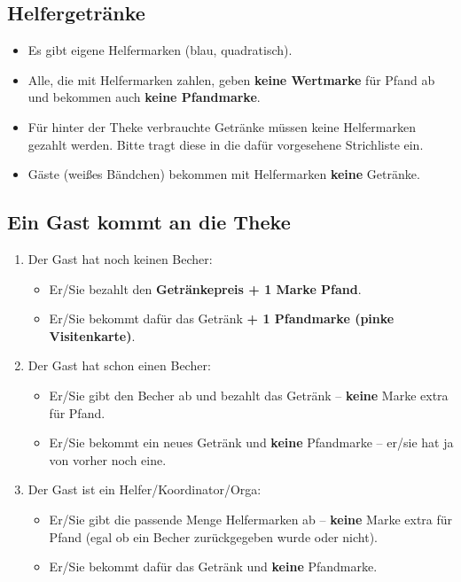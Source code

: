 \subsection{Helfergetränke}
\begin{itemize}
    \item Es gibt eigene Helfermarken (blau, quadratisch).
    \item Alle, die mit Helfermarken zahlen, geben \textbf{keine Wertmarke} für Pfand ab und bekommen auch \textbf{keine Pfandmarke}.
    \item Für hinter der Theke verbrauchte Getränke müssen keine Helfermarken gezahlt werden. Bitte tragt diese in die dafür vorgesehene Strichliste ein.
    \item Gäste (weißes Bändchen) bekommen mit Helfermarken \textbf{keine} Getränke.
\end{itemize}
\subsection{Ein Gast kommt an die Theke}
\begin{enumerate}
    \item Der Gast hat noch keinen Becher:
        \begin{itemize}
            \item Er/Sie bezahlt den \textbf{Getränkepreis + 1 Marke Pfand}.
            \item Er/Sie bekommt dafür das Getränk \textbf{+ 1 Pfandmarke (pinke Visitenkarte)}.
        \end{itemize}
    \item Der Gast hat schon einen Becher:
        \begin{itemize}
            \item Er/Sie gibt den Becher ab und bezahlt das Getränk -- \textbf{keine} Marke extra für Pfand.
            \item Er/Sie bekommt ein neues Getränk und \textbf{keine} Pfandmarke -- er/sie hat ja von vorher noch eine.
        \end{itemize}
    \item Der Gast ist ein Helfer/Koordinator/Orga:
        \begin{itemize}
            \item Er/Sie gibt die passende Menge Helfermarken ab -- \textbf{keine} Marke extra für Pfand (egal ob ein Becher zurückgegeben wurde oder nicht).
            \item Er/Sie bekommt dafür das Getränk und \textbf{keine} Pfandmarke.
        \end{itemize}
\end{enumerate}
